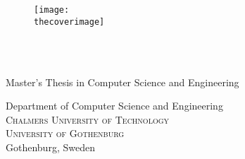 
\newcommand{\oneLineTitle}{\thetitle}
\newcommand{\multiLineTitle}[1]{\thetitle}

\begin{titlepage}

\addtolength{\voffset}{2cm}

\ifdefined\thecoverimage
\begin{figure}[H]
\centering
\vspace{1cm}
\texttt{[image: \\thecoverimage]}
\end{figure}
\else
\vspace{1cm}
\fi

\setlength{\parindent}{0cm}
\setlength{\parskip}{0cm}

\mbox{}
\vfill
{\sf
  \textbf{\Huge \multiLineTitle{0.2cm}} \\[0.5cm]

  \ifdefined\thesubtitle
  {\Large \thesubtitle}\\[0.5cm]
  \fi

  Master's Thesis in Computer Science and Engineering

  \vspace{1em}

  {\Large \theauthor}

  \vspace{2.9cm}

  Department of Computer Science and Engineering \\
  {\normalfont \textsc{Chalmers University of Technology}} \\
  {\normalfont \textsc{University of Gothenburg}} \\
  Gothenburg, Sweden \the\year
}

\end{titlepage}


\newpage
\restoregeometry
\thispagestyle{empty}
\mbox{}


